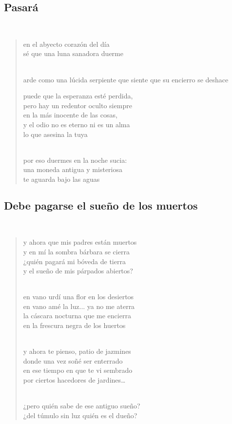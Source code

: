 \documentclass[a4paper, 12pt]{article}
\begin{document}
\pagebreak 
\subsection{Pasará}
~

\begin{verse}
    
en el abyecto corazón del día\\
sé que una luna sanadora duerme\\
~ 

arde como una lúcida serpiente 
que siente que su encierro se deshace
~

puede que la esperanza esté perdida,\\
pero hay un redentor oculto siempre\\
en la más inocente de las cosas,\\
y el odio no es eterno ni es un alma\\
lo que asesina la tuya\\
~

por eso duermes en la noche sucia:\\
una moneda antigua y misteriosa\\
te aguarda bajo las aguas\\
\end{verse}

\pagebreak 

\subsection{Debe pagarse el sueño de los muertos}
~ 

\begin{verse}
y ahora que mis padres están muertos\\
y en mí la sombra bárbara se cierra\\
¿quién pagará mi bóveda de tierra\\
y el sueño de mis párpados abiertos?\\
~ 

en vano urdí una flor en los desiertos\\
en vano amé la luz... ya no me aterra\\
la cáscara nocturna que me encierra\\
en la frescura negra de los huertos\\
~ 

y ahora te pienso, patio de jazmines\\
donde una vez soñé ser enterrado\\
en ese tiempo en que te vi sembrado\\
por ciertos hacedores de jardines…\\
~ 

¿pero quién sabe de ese antiguo sueño?\\
¿del túmulo sin luz quién es el dueño?\\
\end{verse}
\end{document}
